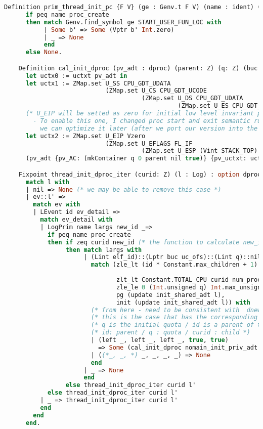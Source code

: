 \begin{lstlisting}[language=Caml]
    Definition prim_thread_init_pc {F V} (ge : Genv.t F V) (name : ident) (args : list lval): option val :=
      if peq name proc_create
      then match Genv.find_symbol ge START_USER_FUN_LOC with
           | Some b' => Some (Vptr b' Int.zero)
           | _ => None
           end
      else None.

    Definition cal_init_dproc (pv_adt : dproc) (parent: Z) (q: Z) (buc : block) (uc_ofs : int): dproc:= 
      let uctx0 := uctxt pv_adt in
      let uctx1 := ZMap.set U_SS CPU_GDT_UDATA
                            (ZMap.set U_CS CPU_GDT_UCODE 
                                      (ZMap.set U_DS CPU_GDT_UDATA
                                                (ZMap.set U_ES CPU_GDT_UDATA uctx0))) in
      (* U_EIP will be setted as zero for initial low level invariant proofs  
        - To enable this one, I changed proc start and exit semantic rules 
          we can optimize it later (after we port our version into the new layer framework *)
      let uctx2 := ZMap.set U_EIP Vzero
                            (ZMap.set U_EFLAGS FL_IF 
                                      (ZMap.set U_ESP (Vint STACK_TOP) uctx1)) in
      (pv_adt {pv_AC: (mkContainer q 0 parent nil true)} {pv_uctxt: uctx2}).

    Fixpoint thread_init_dproc_iter (curid: Z) (l : Log) : option dproc :=
      match l with 
      | nil => None (* we may be able to remove this case *)
      | ev::l' => 
        match ev with 
        | LEvent id ev_detail =>
          match ev_detail with 
          | LogPrim name largs new_id _=>
            if peq name proc_create 
            then if zeq curid new_id (* the function to calculate new_id is defined in ObjPHBThreadreplayfunction.v file *) 
                 then match largs with 
                      | (Lint elf_id)::(Lptr buc uc_ofs)::(Lint q)::nil =>
                        match (zle_lt (id * Constant.max_children + 1) curid (id * Constant.max_children 
                                                                              + 1 + Constant.max_children),
                               zlt_lt Constant.TOTAL_CPU curid num_proc,
                               zle_le 0 (Int.unsigned q) Int.max_unsigned,
                               pg (update init_shared_adt l), 
                               init (update init_shared_adt l)) with    
                        (* from here - need to be consistent with  dnew_semantics in layerlib/PrimSemantics.v *) 
                        (* this is the case that has the corresponding spawn and return the initialized private adt *)
                        (* q is the initial quota / id is a parent of this thread *)
                        (* id: parent / q : quota / curid : child *)
                        | (left _, left _, left _, true, true) 
                          => Some (cal_init_dproc nomain_init_priv_adt id (Int.unsigned q) buc uc_ofs)
                        | ((*_, _, *) _, _, _, _) => None
                        end
                      | _ => None 
                      end
                 else thread_init_dproc_iter curid l'
            else thread_init_dproc_iter curid l'
          | _ => thread_init_dproc_iter curid l'
          end
        end
      end.
    

\end{lstlisting}
